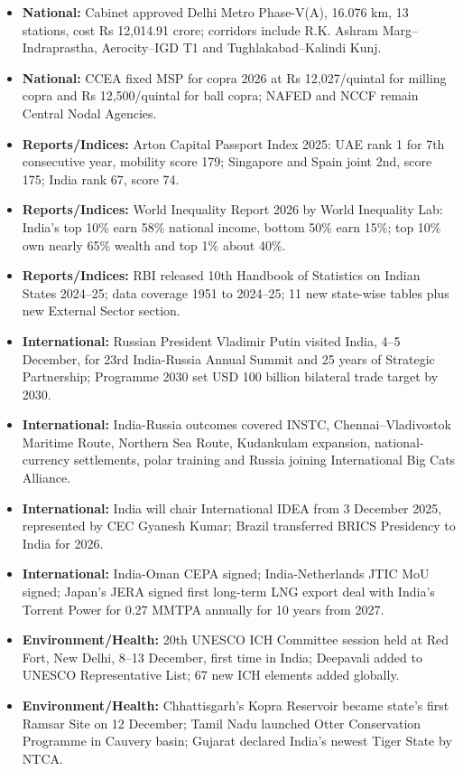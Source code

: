 \documentclass[10pt,a4paper]{article}
\begin{document}
\begin{itemize}
    \item \textbf{National:} Cabinet approved Delhi Metro Phase-V(A), 16.076 km, 13 stations, cost Rs 12,014.91 crore; corridors include R.K. Ashram Marg--Indraprastha, Aerocity--IGD T1 and Tughlakabad--Kalindi Kunj.
    \item \textbf{National:} CCEA fixed MSP for copra 2026 at Rs 12,027/quintal for milling copra and Rs 12,500/quintal for ball copra; NAFED and NCCF remain Central Nodal Agencies.
    \item \textbf{Reports/Indices:} Arton Capital Passport Index 2025: UAE rank 1 for 7th consecutive year, mobility score 179; Singapore and Spain joint 2nd, score 175; India rank 67, score 74.
    \item \textbf{Reports/Indices:} World Inequality Report 2026 by World Inequality Lab: India's top 10\% earn 58\% national income, bottom 50\% earn 15\%; top 10\% own nearly 65\% wealth and top 1\% about 40\%.
    \item \textbf{Reports/Indices:} RBI released 10th Handbook of Statistics on Indian States 2024--25; data coverage 1951 to 2024--25; 11 new state-wise tables plus new External Sector section.
    \item \textbf{International:} Russian President Vladimir Putin visited India, 4--5 December, for 23rd India-Russia Annual Summit and 25 years of Strategic Partnership; Programme 2030 set USD 100 billion bilateral trade target by 2030.
    \item \textbf{International:} India-Russia outcomes covered INSTC, Chennai--Vladivostok Maritime Route, Northern Sea Route, Kudankulam expansion, national-currency settlements, polar training and Russia joining International Big Cats Alliance.
    \item \textbf{International:} India will chair International IDEA from 3 December 2025, represented by CEC Gyanesh Kumar; Brazil transferred BRICS Presidency to India for 2026.
    \item \textbf{International:} India-Oman CEPA signed; India-Netherlands JTIC MoU signed; Japan's JERA signed first long-term LNG export deal with India's Torrent Power for 0.27 MMTPA annually for 10 years from 2027.
    \item \textbf{Environment/Health:} 20th UNESCO ICH Committee session held at Red Fort, New Delhi, 8--13 December, first time in India; Deepavali added to UNESCO Representative List; 67 new ICH elements added globally.
    \item \textbf{Environment/Health:} Chhattisgarh's Kopra Reservoir became state's first Ramsar Site on 12 December; Tamil Nadu launched Otter Conservation Programme in Cauvery basin; Gujarat declared India's newest Tiger State by NTCA.

\end{itemize}
\end{document}
